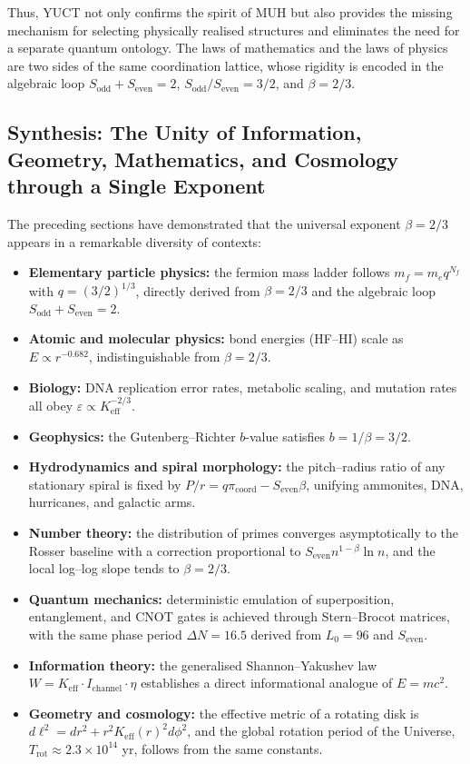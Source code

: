 \documentclass[12pt]{article}
\newcommand{\Sodd}{S_{\mathrm{odd}}}
\newcommand{\Seven}{S_{\mathrm{even}}}
\begin{document}
	Thus, YUCT not only confirms the spirit of MUH but also provides the missing mechanism for selecting physically realised structures and eliminates the need for a separate quantum ontology. The laws of mathematics and the laws of physics are two sides of the same coordination lattice, whose rigidity is encoded in the algebraic loop \(\Sodd + \Seven = 2\), \(\Sodd/\Seven = 3/2\), and \(\beta = 2/3\).
	
	
	\subsection{Synthesis: The Unity of Information, Geometry, Mathematics, and Cosmology through a Single Exponent}
	
	The preceding sections have demonstrated that the universal exponent \(\beta = 2/3\) appears in a remarkable diversity of contexts:
	
	\begin{itemize}
		\item \textbf{Elementary particle physics:} the fermion mass ladder follows \(m_f = m_e q^{N_f}\) with \(q = (3/2)^{1/3}\), directly derived from \(\beta = 2/3\) and the algebraic loop \(S_{\mathrm{odd}}+S_{\mathrm{even}}=2\).
		\item \textbf{Atomic and molecular physics:} bond energies (HF--HI) scale as \(E \propto r^{-0.682}\), indistinguishable from \(\beta = 2/3\).
		\item \textbf{Biology:} DNA replication error rates, metabolic scaling, and mutation rates all obey \(\varepsilon \propto K_{\mathrm{eff}}^{-2/3}\).
		\item \textbf{Geophysics:} the Gutenberg--Richter \(b\)-value satisfies \(b = 1/\beta = 3/2\).
		\item \textbf{Hydrodynamics and spiral morphology:} the pitch--radius ratio of any stationary spiral is fixed by \(P/r = q \pi_{\mathrm{coord}} - S_{\mathrm{even}}\beta\), unifying ammonites, DNA, hurricanes, and galactic arms.
		\item \textbf{Number theory:} the distribution of primes converges asymptotically to the Rosser baseline with a correction proportional to \(\Seven n^{1-\beta}\ln n\), and the local log--log slope tends to \(\beta = 2/3\).
		\item \textbf{Quantum mechanics:} deterministic emulation of superposition, entanglement, and CNOT gates is achieved through Stern--Brocot matrices, with the same phase period \(\Delta N = 16.5\) derived from \(L_0=96\) and \(\Seven\).
		\item \textbf{Information theory:} the generalised Shannon--Yakushev law \(W = K_{\mathrm{eff}} \cdot I_{\mathrm{channel}} \cdot \eta\) establishes a direct informational analogue of \(E = mc^2\).
		\item \textbf{Geometry and cosmology:} the effective metric of a rotating disk is \(d\ell^2 = dr^2 + r^2 K_{\mathrm{eff}}(r)^2 d\phi^2\), and the global rotation period of the Universe, \(T_{\mathrm{rot}} \approx 2.3\times10^{14}\) yr, follows from the same constants.
	\end{itemize}
	
\end{document}
